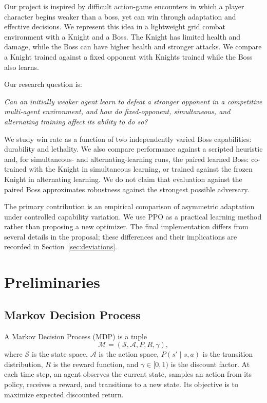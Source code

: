 \documentclass{article}
\begin{document}
Our project is inspired by difficult action-game encounters in which a player character begins weaker than a boss, yet can win through adaptation and effective decisions. We represent this idea in a lightweight grid combat environment with a Knight and a Boss. The Knight has limited health and damage, while the Boss can have higher health and stronger attacks. We compare a Knight trained against a fixed opponent with Knights trained while the Boss also learns.

Our research question is:
\begin{center}
\emph{Can an initially weaker agent learn to defeat a stronger opponent in a competitive multi-agent environment, and how do fixed-opponent, simultaneous, and alternating training affect its ability to do so?}
\end{center}
We study win rate as a function of two independently varied Boss capabilities: durability and lethality. We also compare performance against a scripted heuristic and, for simultaneous- and alternating-learning runs, the paired learned Boss: co-trained with the Knight in simultaneous learning, or trained against the frozen Knight in alternating learning. We do not claim that evaluation against the paired Boss approximates robustness against the strongest possible adversary.

The primary contribution is an empirical comparison of asymmetric adaptation under controlled capability variation. We use PPO as a practical learning method rather than proposing a new optimizer. The final implementation differs from several details in the proposal; these differences and their implications are recorded in Section~\ref{sec:deviations}.

\section{Preliminaries}
\subsection{Markov Decision Process}
A Markov Decision Process (MDP) is a tuple
\begin{equation}
\mathcal{M}=(\mathcal{S},\mathcal{A},P,R,\gamma),
\end{equation}
where $\mathcal{S}$ is the state space, $\mathcal{A}$ is the action space, $P(s'\mid s,a)$ is the transition distribution, $R$ is the reward function, and $\gamma\in[0,1)$ is the discount factor. At each time step, an agent observes the current state, samples an action from its policy, receives a reward, and transitions to a new state. Its objective is to maximize expected discounted return.
\end{document}

